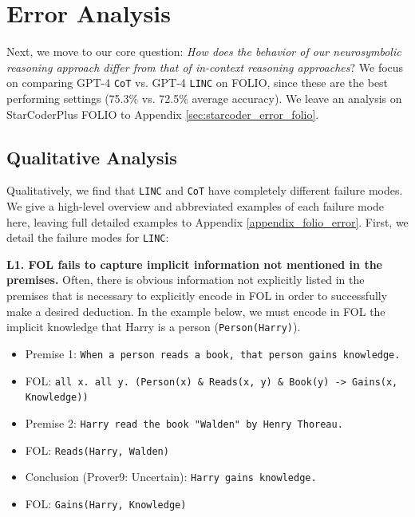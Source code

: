 \documentclass[11pt]{article}
\begin{document}
\section{Error Analysis}
\label{sec:error_analysis}
Next, we move to our core question: \textit{How does the behavior of our neurosymbolic reasoning approach differ from that of in-context reasoning approaches}?
We focus on comparing GPT-4 \texttt{CoT} vs. GPT-4 \texttt{LINC} on FOLIO, since these are the best performing settings (75.3\% vs. 72.5\% average accuracy). We leave an analysis on StarCoderPlus FOLIO to Appendix \ref{sec:starcoder_error_folio}.

\subsection{Qualitative Analysis} \label{sec:error_qualitative}
Qualitatively, we find that \texttt{LINC} and \texttt{CoT} have completely different failure modes. We give a high-level overview and abbreviated examples of each failure mode here, leaving full detailed examples to Appendix \ref{appendix_folio_error}. First, we detail the failure modes for \texttt{LINC}:

\textbf{L1. FOL fails to capture implicit information not mentioned in the premises.} Often, there is obvious information not explicitly listed in the premises that is necessary to explicitly encode in FOL in order to successfully make a desired deduction. In the example below, we must encode in FOL the implicit knowledge that Harry is a person (\texttt{Person(Harry)}).

\begin{itemize}[leftmargin=*]
    \item[] \small Premise 1: \texttt{When a person reads a book, that person gains knowledge.}
    \item[] \small FOL: \texttt{all x. all y. (Person(x) \& Reads(x, y) \& Book(y) -> Gains(x, Knowledge))}
    \item[] \small Premise 2: \texttt{Harry read the book "Walden" by Henry Thoreau.}
    \item[] \small FOL: \texttt{Reads(Harry, Walden)}
    \item[] \small Conclusion (Prover9: Uncertain): \texttt{Harry gains knowledge.}
    \item[] \small FOL: \texttt{Gains(Harry, Knowledge)}
\end{itemize}
\end{document}
